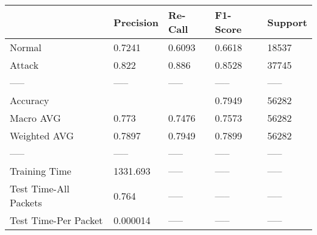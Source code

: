 \begin{tabular}{lllll}
\toprule
{} & Precision & Re-Call & F1-Score & Support \\
\midrule
Normal                &    0.7241 &  0.6093 &   0.6618 &   18537 \\
Attack                &     0.822 &   0.886 &   0.8528 &   37745 \\
-----                 &     ----- &   ----- &    ----- &   ----- \\
Accuracy              &           &         &   0.7949 &   56282 \\
Macro AVG             &     0.773 &  0.7476 &   0.7573 &   56282 \\
Weighted AVG          &    0.7897 &  0.7949 &   0.7899 &   56282 \\
-----                 &     ----- &   ----- &    ----- &   ----- \\
Training Time         &  1331.693 &   ----- &    ----- &   ----- \\
Test Time-All Packets &     0.764 &   ----- &    ----- &   ----- \\
Test Time-Per Packet  &  0.000014 &   ----- &    ----- &   ----- \\
\bottomrule
\end{tabular}
